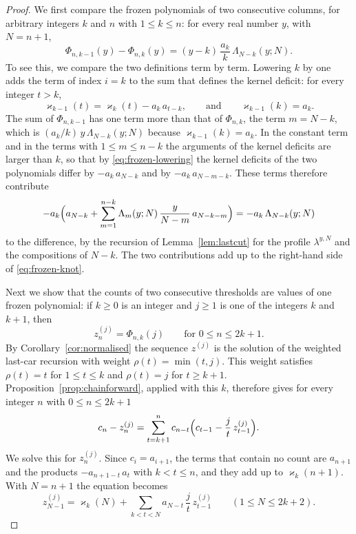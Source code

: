 \documentclass{amsart}
\theoremstyle{definition}
\theoremstyle{remark}
\numberwithin{equation}{section}
\begin{document}
\begin{proof}
We first compare the frozen polynomials of two consecutive columns, for
arbitrary integers $k$ and $n$ with $1\le k\le n$: for every real number
$y$, with $N=n+1$,
\begin{equation}\label{eq:frozen-knot}
\Phi_{n,k-1}(y)-\Phi_{n,k}(y)=(y-k)\,\frac{a_k}{k}\,\Lambda_{N-k}(y;N).
\end{equation}
To see this, we compare the two definitions term by term. Lowering $k$ by
one adds the term of index $i=k$ to the sum that defines the kernel
deficit: for every integer $t>k$,
\begin{equation}\label{eq:frozen-lowering}
\varkappa_{k-1}(t)=\varkappa_k(t)-a_k\,a_{t-k},
\qquad\text{and}\qquad
\varkappa_{k-1}(k)=a_k .
\end{equation}
The sum of
$\Phi_{n,k-1}$ has one term more than that of $\Phi_{n,k}$, the term
$m=N-k$, which is $(a_k/k)\,y\,\Lambda_{N-k}(y;N)$ because
$\varkappa_{k-1}(k)=a_k$. In the constant term and in the terms with
$1\le m\le n-k$ the arguments of the kernel deficits are larger than $k$,
so that by \eqref{eq:frozen-lowering} the kernel deficits of the two
polynomials differ by $-a_k\,a_{N-k}$ and by $-a_k\,a_{N-m-k}$. These terms
therefore contribute
\[
-a_k\Bigl(a_{N-k}+\sum_{m=1}^{n-k}\Lambda_m(y;N)\,\frac{y}{N-m}\,a_{N-k-m}\Bigr)
=-a_k\,\Lambda_{N-k}(y;N)
\]
to the difference, by the recursion of Lemma~\ref{lem:lastcut} for
the profile $\lambda^{y,N}$ and the compositions of $N-k$. The two
contributions add up to the right-hand side of \eqref{eq:frozen-knot}.

Next we show that the counts of two consecutive thresholds are values of one
frozen polynomial: if $k\ge0$ is an integer and $j\ge1$ is one of the
integers $k$ and $k+1$, then
\begin{equation}\label{eq:frozen-values}
z^{(j)}_n=\Phi_{n,k}(j)\qquad\text{for }0\le n\le 2k+1 .
\end{equation}
By Corollary~\ref{cor:normalised} the sequence $z^{(j)}$ is the solution of the
weighted last-car recursion with weight $\rho(t)=\min(t,j)$. This
weight satisfies $\rho(t)=t$ for $1\le t\le k$ and $\rho(t)=j$ for
$t\ge k+1$. Proposition~\ref{prop:chainforward}, applied with this $k$,
therefore gives for every integer $n$ with $0\le n\le 2k+1$
\[
c_n-z^{(j)}_n=\sum_{t=k+1}^{n}c_{n-t}\Bigl(c_{t-1}-\frac{j}{t}\,z^{(j)}_{t-1}\Bigr).
\]
We solve this for $z^{(j)}_n$. Since $c_i=a_{i+1}$, the terms that contain
no count are $a_{n+1}$ and the products $-a_{n+1-t}\,a_t$ with $k<t\le n$,
and they add up to $\varkappa_k(n+1)$. With $N=n+1$ the equation becomes
\begin{equation}\label{eq:frozen-volterra}
z^{(j)}_{N-1}=\varkappa_k(N)+\sum_{k<t<N}a_{N-t}\,\frac{j}{t}\,z^{(j)}_{t-1}
\qquad(1\le N\le 2k+2).
\end{equation}


\end{proof}
\end{document}
